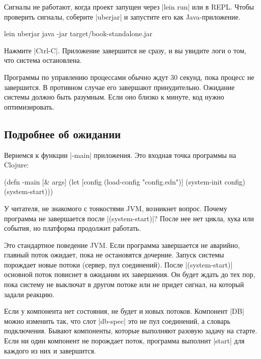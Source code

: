 Сигналы не работают, когда проект запущен через \spverb|lein run| или в
REPL. Чтобы проверить сигналы, соберите \spverb|uberjar| и запустите его как
Java-приложение.

\begin{english}
  \begin{bash}
lein uberjar
java -jar target/book-standalone.jar
  \end{bash}
\end{english}

Нажмите \spverb|Ctrl-C|. Приложение завершится не сразу, и вы увидите логи о
том, что система остановлена.

Программы по управлению процессами обычно ждут 30 секунд, пока процесс не
завершится. В противном случае его завершают принудительно. Ожидание системы
должно быть разумным. Если оно близко к минуте, код нужно оптимизировать.

\subsection{Подробнее об ожидании}

Вернемся к функции \spverb|-main| приложения. Это входная точка программы на
Clojure:

\begin{english}
  \begin{clojure}
(defn -main [& args]
  (let [config (load-config "config.edn")]
    (system-init config)
    (system-start)))
  \end{clojure}
\end{english}

У читателя, не знакомого с тонкостями JVM, возникнет вопрос. Почему программа не
завершается после \spverb|(system-start)|? После нее нет цикла, хука или
события, но платформа продолжит работать.

Это стандартное поведение JVM. Если программа завершается не аварийно, главный
поток ожидает, пока не остановятся дочерние. Запуск системы порождает новые
потоки (сервер, пул соединений). После \spverb|(system-start)| основной поток
повиснет в ожидании их завершения. Он будет ждать до тех пор, пока систему не
выключат в другом потоке или не придет сигнал, на который задали реакцию.

Если у компонента нет состояния, не будет и новых потоков. Компонент \spverb|DB|
можно изменить так, что слот \spverb|db-spec| это не пул соединений, а словарь
подключения. Бывают компоненты, которые выполняют разовую задачу на старте. Если
ни один компонент не порождает поток, программа выполнит \spverb|start| для
каждого из них и завершится.

